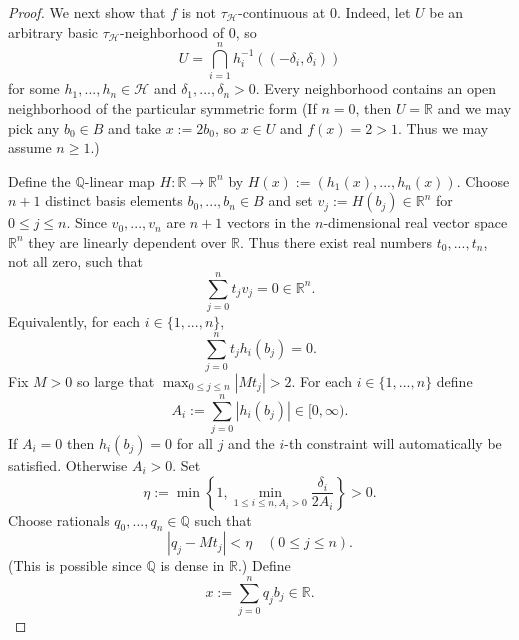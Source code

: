 \documentclass[11pt]{amsart} %
\theoremstyle{definition}
\newcommand{\AD}{\mathcal{H}}
\begin{document}
\begin{proof}
We next show that $f$ is not $\tau_{\AD}$-continuous at $0$. Indeed, let $U$ be an arbitrary basic $\tau_{\AD}$-neighborhood of $0$, so
\begin{equation} 
U=\bigcap_{i=1}^{n}h_{i}^{-1}((-\delta_{i},\delta_{i})) 
\end{equation} 
for some $h_{1},...,h_{n}\in\mathcal{H}$ and $\delta_{1},...,\delta_{n}>0$. Every neighborhood contains an open neighborhood of the particular symmetric form (If $n=0$, then $U=\mathbb{R}$ and we may pick any $b_{0}\in B$ and take $x:=2b_{0}$, so $x\in U$ and $f(x)=2>1$. Thus we may assume $n\ge1$.)

Define the $\mathbb{Q}$-linear map $H:\mathbb{R}\rightarrow\mathbb{R}^{n}$ by $H(x):=(h_{1}(x),...,h_{n}(x)). $
Choose $n+1$ distinct basis elements $b_{0},...,b_{n}\in B$ and set $v_{j}:=H(b_{j})\in\mathbb{R}^{n}$ for $0\le j\le n$. Since $v_{0},...,v_{n}$ are $n+1$ vectors in the $n$-dimensional real vector space $\mathbb{R}^{n}$ they are linearly dependent over $\mathbb{R}$. Thus there exist real numbers $t_{0},...,t_{n}$, not all zero, such that
\begin{equation}
\sum_{j=0}^{n}t_{j}v_{j}=0\in\mathbb{R}^{n}.
\end{equation}
Equivalently, for each $i\in\{1,...,n\}$,
\begin{equation}
\sum_{j=0}^{n}t_{j}h_{i}(b_{j})=0.
\label{zero:sum}
\end{equation}
Fix $M>0$ so large that $\max_{0\le j\le n}|Mt_{j}|>2$. For each $i\in\{1,...,n\}$ define
\begin{equation} 
A_{i}:=\sum_{j=0}^{n}|h_{i}(b_{j})|\in[0,\infty). \end{equation} 
If $A_{i}=0$ then $h_{i}(b_{j})=0$ for all $j$ and the $i$-th constraint will automatically be satisfied. Otherwise $A_{i}>0$. Set
\begin{equation}
\eta:=\min\left\{1,\min_{1\le i\le n, A_{i}>0}\frac{\delta_{i}}{2A_{i}}\right\}>0.
\label{def:eta} 
\end{equation}
Choose rationals $q_{0},...,q_{n}\in\mathbb{Q}$ such that
\begin{equation}
|q_{j}-Mt_{j}|<\eta \quad (0\le j\le n).
\label{eta}
\end{equation}
(This is possible since $\mathbb{Q}$ is dense in $\mathbb{R}$.) Define
\begin{equation}
x:=\sum_{j=0}^{n}q_{j}b_{j}\in\mathbb{R}.
\label{ham:exp2}
\end{equation}


\end{proof}
\end{document}
